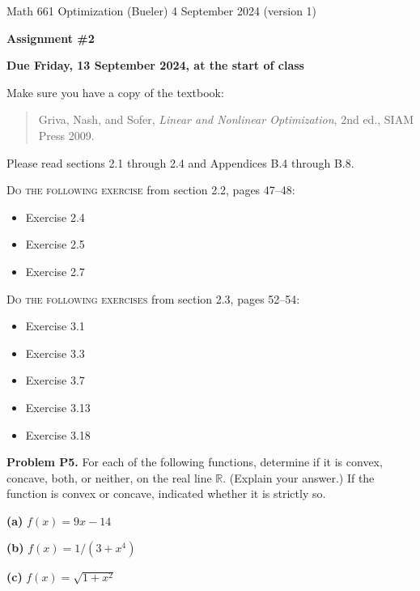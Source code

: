 \documentclass[12pt]{amsart}
\newcommand{\RR}{\mathbb{R}}
\newcommand{\prob}[1]{\bigskip\noindent\textbf{#1}\quad }
\newcommand{\epart}[1]{\medskip\noindent\textbf{(#1)}\quad }
\begin{document}
\scriptsize \noindent Math 661 Optimization (Bueler) \hfill 4 September 2024 (version 1)
\normalsize

\medskip\bigskip

\Large\centerline{\textbf{Assignment \#2}}
\large
\bigskip

\centerline{\textbf{Due Friday, 13 September 2024, at the start of class}}
\bigskip
\normalsize

\thispagestyle{empty}

\bigskip
\noindent Make sure you have a copy of the textbook:

\begin{quote}
Griva, Nash, and Sofer, \emph{Linear and Nonlinear Optimization}, 2nd ed., SIAM Press 2009.
\end{quote}

\noindent Please read sections 2.1 through 2.4 and Appendices B.4 through B.8.

\bigskip
\noindent \textsc{Do the following exercise} from section 2.2, pages 47--48:

\begin{itemize}
\item Exercise 2.4
\item Exercise 2.5
\item Exercise 2.7
\end{itemize}

\bigskip
\noindent \textsc{Do the following exercises} from section 2.3, pages 52--54:

\begin{itemize}
\item Exercise 3.1
\item Exercise 3.3
\item Exercise 3.7
\item Exercise 3.13
\item Exercise 3.18
\end{itemize}

\prob{Problem P5.}  For each of the following functions, determine if it is convex, concave, both, or neither, on the real line $\RR$.  (Explain your answer.)  If the function is convex or concave, indicated whether it is strictly so.

\epart{a}  $f(x) = 9x - 14$

\epart{b}  $f(x) = 1 / (3+x^4)$

\epart{c}  $f(x) = \sqrt{1 + x^2}$
\end{document}
